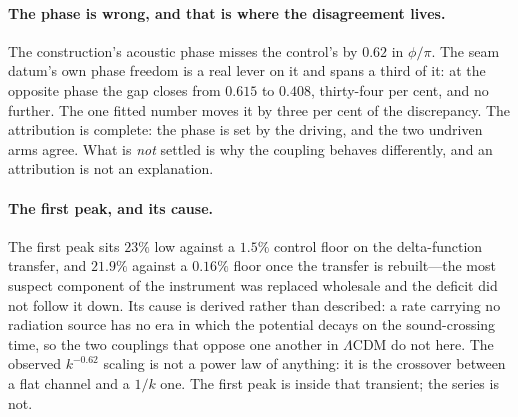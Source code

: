 \paragraph{The phase is wrong, and that is where the disagreement lives.} The construction's
acoustic phase misses the control's by $0.62$ in $\phi/\pi$. The seam datum's own phase freedom is
a real lever on it and spans a third of it: at the opposite phase the gap closes from $0.615$ to
$0.408$, thirty-four per cent, and no further.
The one fitted number moves it by three per cent of the discrepancy. The attribution is complete:
the phase is set by the driving, and the two undriven arms
agree. What is \emph{not} settled
is why the coupling behaves differently, and an attribution is not an explanation.

\paragraph{The first peak, and its cause.} The first peak sits $23\%$ low against a $1.5\%$
control floor on the delta-function transfer, and $21.9\%$ against a $0.16\%$ floor once the
transfer is rebuilt---the most suspect component of the instrument was replaced wholesale and the
deficit did not follow it down. Its cause is derived rather than described: a rate carrying no
radiation source has no era in which the potential decays on the sound-crossing time, so the two
couplings that oppose one another in $\Lambda$CDM do not
here. The
observed $k^{-0.62}$ scaling is not a power law of anything: it is the crossover between a flat
channel and a $1/k$ one. The first peak is inside
that transient; the series is not.

